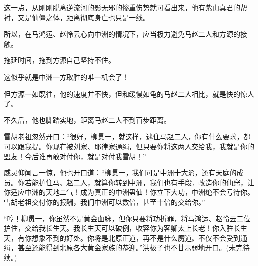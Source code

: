 \begin{this_body}
这一点，从刚刚脱离逆流河的影无邪的惨重伤势就可看出来，他有紫山真君的帮衬，又是仙僵之体，距离彻底身亡也只是一线。

所以，在马鸿运、赵怜云心向中洲的情况下，应当极力避免马赵二人和方源的接触。

拖延时间，拖到方源自己坚持不住。

这似乎就是中洲一方取胜的唯一机会了！

但方源一如既往，他的速度并不快，但和缓慢如龟的马赵二人相比，就是快的惊人了。

不久后，他也脚踏实地，距离马赵二人不到百步距离。

雪胡老祖忽然开口：“很好，柳贯一，就这样，逮住马赵二人，你有什么要求，都可以跟我提。你现在被刘家、耶律家通缉，但只要你将这两人交给我，我就是你的盟友！今后谁再敢对付你，就是对付我雪胡！”

威灵仰闻言一惊，他也开口道：“柳贯一，我们可是中洲十大派，还有天庭的成员。你若能护住马、赵二人，就算你转到中洲，我们也有手段，改造你的仙窍，让你适应中洲的天地二气！成为真正的中洲蛊仙！你立下大功，中洲绝不会亏待你。雪胡老祖交付你的报酬，我们中洲可以数倍，甚至十倍的交给你。”

“哼！柳贯一，你虽然不是黄金血脉，但你只要将功折罪，将马鸿运、赵怜云二位护住，交给我长生天。我长生天可以破例，收容你为客卿太上长老！你入驻长生天，有你想象不到的好处。你将是北原正道，再不是什么魔道。不仅不会受到通缉，甚至还能得到北原各大黄金家族的恭迎。”洪极子也不甘示弱地开口。(未完待续。)

\end{this_body}

